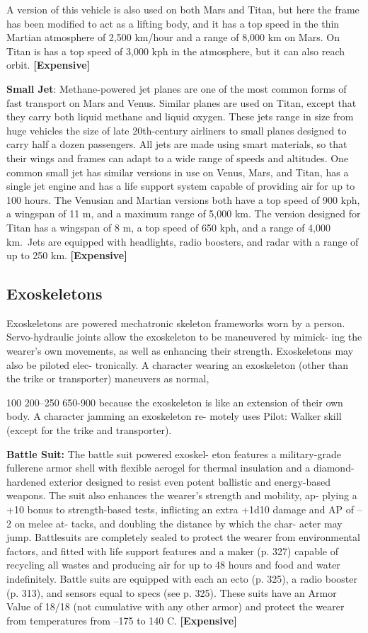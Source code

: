 A version of this vehicle is also used on both Mars 
and Titan, but here the frame has been modified to 
act as a lifting body, and it has a top speed in the thin 
Martian atmosphere of 2,500 km/hour and a range 
of 8,000 km on Mars. On Titan is has a top speed 
of 3,000 kph in the atmosphere, but it can also reach 
orbit. \textbf{[Expensive]}

\textbf{Small Jet}: Methane-powered jet planes are one of 
the most common forms of fast transport on Mars 
and Venus. Similar planes are used on Titan, except 
that they carry both liquid methane and liquid oxygen. 
These jets range in size from huge vehicles the size of 
late 20th-century airliners to small planes designed to 
carry half a dozen passengers. All jets are made using 
smart materials, so that their wings and frames can 
adapt to a wide range of speeds and altitudes. One 
common small jet has similar versions in use on Venus, 
Mars, and Titan, has a single jet engine and has a life 
support system capable of providing air for up to 100 
hours. The Venusian and Martian versions both have 
a top speed of 900 kph, a wingspan of 11 m, and a 
maximum range of 5,000 km. The version designed 
for Titan has a wingspan of 8 m, a top speed of 650 
kph, and a range of 4,000 km. Jets are equipped with 
headlights, radio boosters, and radar with a range of 
up to 250 km. \textbf{[Expensive]}

\subsection{Exoskeletons}

Exoskeletons are powered mechatronic skeleton 
frameworks worn by a person. Servo-hydraulic joints 
allow the exoskeleton to be maneuvered by mimick-
ing the wearer's own movements, as well as enhancing 
their strength. Exoskeletons may also be piloted elec-
tronically. A character wearing an exoskeleton (other 
than the trike or transporter) maneuvers as normal, 

100
200–250
650-900
because the exoskeleton is like an extension of their 
own body. A character jamming an exoskeleton re-
motely uses Pilot: Walker skill (except for the trike 
and transporter).

\textbf{Battle Suit: }The battle suit powered exoskel-
eton features a military-grade fullerene armor shell 
with flexible aerogel for thermal insulation and a 
diamond-hardened exterior designed to resist even 
potent ballistic and energy-based weapons. The suit 
also enhances the wearer's strength and mobility, ap-
plying a +10 bonus to strength-based tests, inflicting 
an extra +1d10 damage and AP of –2 on melee at-
tacks, and doubling the distance by which the char-
acter may jump. Battlesuits are completely sealed to 
protect the wearer from environmental factors, and 
fitted with life support features and a maker (p. 327) 
capable of recycling all wastes and producing air 
for up to 48 hours and food and water indefinitely. 
Battle suits are equipped with each an ecto (p. 325), 
a radio booster (p. 313), and sensors equal to specs 
(see p. 325). These suits have an Armor Value of 
18/18 (not cumulative with any other armor) and 
protect the wearer from temperatures from –175 to 
140 C. \textbf{[Expensive]}

